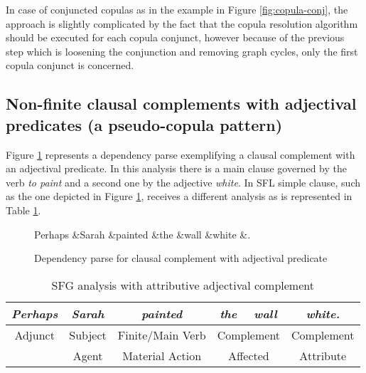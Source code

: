     In case of conjuncted copulas as in the example in Figure \ref{fig:copula-conj}, the approach is slightly complicated by the fact that the copula resolution algorithm should be executed for each copula conjunct, however because of the previous step which is loosening the conjunction and removing graph cycles, only the first copula conjunct is concerned.

\subsection{Non-finite clausal complements with adjectival predicates (a pseudo-copula pattern)}
\label{sec:nonfinite-clausal-complement}
    Figure \ref{fig:clausal-complement-jj} represents a dependency parse exemplifying a clausal complement with an adjectival predicate. In this analysis there is a main clause governed by the verb \textit{to paint} and a second one by the adjective \textit{white}. In SFL simple clause, such as the one depicted in Figure \ref{fig:clausal-complement-jj}, receives a different analysis as is represented in Table \ref{tab:adjectival-complement}.

    \begin{figure}[!ht]
    	\centering
    	\begin{dependency}
    		\begin{deptext}[]
    			Perhaps \&Sarah \&painted \&the \&wall \&white \&. \\
    		\end{deptext}
    	\end{dependency}
    	\caption{Dependency parse for clausal complement with adjectival predicate}
    	\label{fig:clausal-complement-jj}
    \end{figure} 

    \begin{table}[!ht]
    	\centering
    	\begin{tabular}{|c|c|c|c|c|c|}
    		\hline
    		\textit{Perhaps} & \textit{Sarah} & \textit{painted} & \textit{the}   & \textit{wall}  & \textit{white.} \\ \hline
    		Adjunct          & Subject        & Finite/Main Verb & \multicolumn{2}{c|}{Complement} & Complement      \\ \hline
    		& Agent          & Material Action  & \multicolumn{2}{c|}{Affected}   & Attribute       \\ \hline
    	\end{tabular}
    	\caption{SFG analysis with attributive adjectival complement}
    	\label{tab:adjectival-complement}
\end{table}

